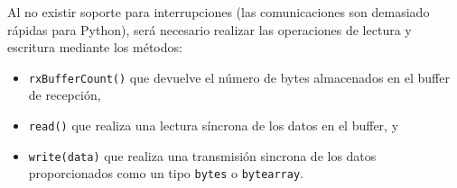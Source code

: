 

Al no existir soporte para interrupciones (las comunicaciones \IIC{} son demasiado rápidas para Python), será necesario realizar las operaciones de lectura y escritura mediante los métodos:
\begin{itemize}[nosep] %
	\item \texttt{rxBufferCount()} que devuelve el número de bytes almacenados en el buffer de recepción,
	\item \texttt{read()} que realiza una lectura síncrona de los datos en el buffer,
	y
	\item \texttt{write(data)} que realiza una transmisión sincrona de los datos proporcionados como un tipo \texttt{bytes} o \texttt{bytearray}.
\end{itemize}
